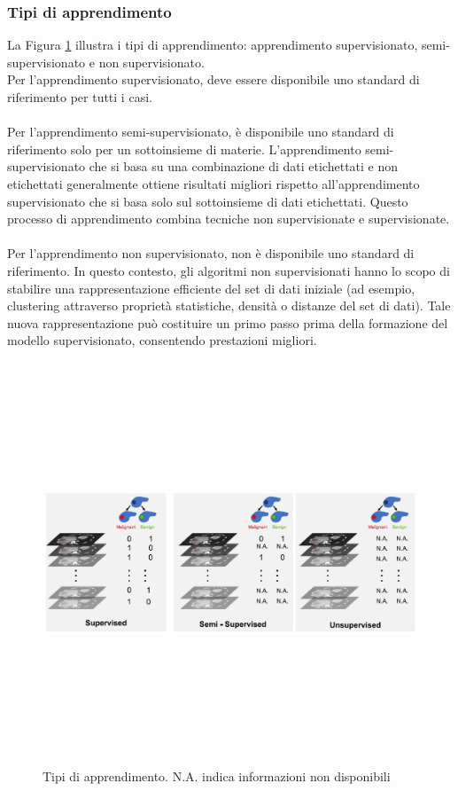 \documentclass[12pt,a4paper]{report}
\begin{document}
\subsubsection{Tipi di apprendimento}
La Figura \ref{fig:type-of-learning} illustra i tipi di apprendimento: apprendimento supervisionato, semi-supervisionato e non supervisionato.\\
Per l'apprendimento supervisionato, deve essere disponibile uno standard di riferimento per tutti i casi.\\
\\
Per l'apprendimento semi-supervisionato, è disponibile uno standard di riferimento solo per un sottoinsieme di materie. L'apprendimento semi-supervisionato che si basa su una combinazione di dati etichettati e non etichettati generalmente ottiene risultati migliori rispetto all'apprendimento supervisionato che si basa solo sul sottoinsieme di dati etichettati. Questo processo di apprendimento combina tecniche non supervisionate e supervisionate.\\
\\
Per l'apprendimento non supervisionato, non è disponibile uno standard di riferimento. In questo contesto, gli algoritmi non supervisionati hanno lo scopo di stabilire una rappresentazione efficiente del set di dati iniziale (ad esempio, clustering attraverso proprietà statistiche, densità o distanze del set di dati). Tale nuova rappresentazione può costituire un primo passo prima della formazione del modello supervisionato, consentendo prestazioni migliori.\\

\begin{figure}[h!]
    \begin{center}
        \includegraphics[width=12cm,height=12cm,keepaspectratio]{Type-of-learning}
    \end{center}
    \caption{Tipi di apprendimento. N.A. indica informazioni non disponibili}
    \label{fig:type-of-learning}
\end{figure}
\end{document}

